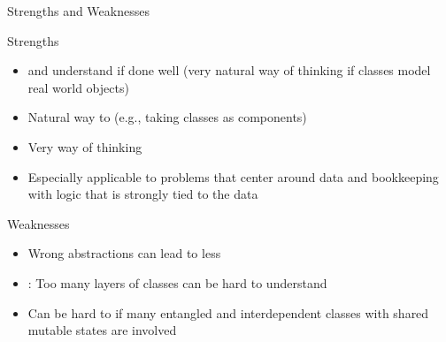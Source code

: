 \begin{frame}{Strengths and Weaknesses}

\begin{block}{Strengths}
	\only<+->{}
	\begin{itemize}
		\item<+->  and understand if done well (very natural way of thinking if classes model real world objects)
		\item<+-> Natural way to  (e.g., taking classes as components)
		\item<+-> Very  way of thinking
		\item<+-> Especially applicable to problems that center around data and bookkeeping with logic that is strongly tied to the data
	\end{itemize}
\end{block}
\begin{block}{Weaknesses}
\begin{itemize}
	\item<+-> Wrong abstractions can lead to less 
	\item<+-> : Too many layers of classes can be hard to understand
	\item<+-> Can be hard to  if many entangled and interdependent classes with shared mutable states are involved 
\end{itemize}
\end{block}
\end{frame}
